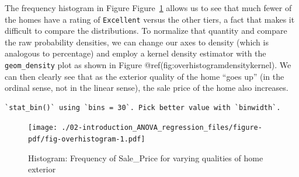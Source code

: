 \documentclass[
  letterpaper,
  DIV=11,
  numbers=noendperiod]{scrreprt}
\newenvironment{Shaded}{\begin{snugshade}}{\end{snugshade}}
\newcommand{\AttributeTok}[1]{\textcolor[rgb]{0.40,0.45,0.13}{#1}}
\newcommand{\DecValTok}[1]{\textcolor[rgb]{0.68,0.00,0.00}{#1}}
\newcommand{\FloatTok}[1]{\textcolor[rgb]{0.68,0.00,0.00}{#1}}
\newcommand{\FunctionTok}[1]{\textcolor[rgb]{0.28,0.35,0.67}{#1}}
\newcommand{\NormalTok}[1]{\textcolor[rgb]{0.00,0.23,0.31}{#1}}
\newcommand{\SpecialCharTok}[1]{\textcolor[rgb]{0.37,0.37,0.37}{#1}}
\newcommand{\StringTok}[1]{\textcolor[rgb]{0.13,0.47,0.30}{#1}}
\begin{document}
The frequency histogram in Figure Figure~\ref{fig-overhistogram} allows
us to see that much fewer of the homes have a rating of
\texttt{Excellent} versus the other tiers, a fact that makes it
difficult to compare the distributions. To normalize that quantity and
compare the raw probability densities, we can change our axes to density
(which is analogous to percentage) and employ a kernel density estimator
with the \texttt{geom\_density} plot as shown in Figure
@ref(fig:overhistogramdensitykernel). We can then clearly see that as
the exterior quality of the home ``goes up'' (in the ordinal sense, not
in the linear sense), the sale price of the home also increases.

\begin{Shaded}
\end{Shaded}

\begin{verbatim}
`stat_bin()` using `bins = 30`. Pick better value with `binwidth`.
\end{verbatim}

\begin{figure}[H]

{\centering \texttt{[image: ./02-introduction\_ANOVA\_regression\_files/figure-pdf/fig-overhistogram-1.pdf]}

}

\caption{\label{fig-overhistogram}Histogram: Frequency of Sale\_Price
for varying qualities of home exterior}

\end{figure}

\begin{Shaded}
\end{Shaded}
\end{document}
